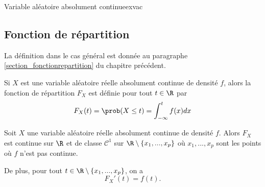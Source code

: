 \begin{exemple}{Variable aléatoire absolument continue}{exvac}
\begin{center}
    \end{center}

\end{exemple}


\subsection{Fonction de répartition}

La définition dans le cas général est donnée au paragraphe \ref{section_fonctionrepartition} du chapitre précédent. 

Si $X$ est une variable aléatoire réelle absolument continue de densité $f$, alors la fonction de répartition $F_X$ est définie pour tout $t \in \R $ par 
$$F_X(t) = \prob(X \leq t) = \int_{-\infty}^{t} f(x)dx$$

\begin{proposition}{}{}
	Soit $X$ une variable aléatoire réelle absolument continue de densité $f$. Alors $F_X$ est continue sur $\R$ et de classe $\mathcal{C}^1$ sur $\R \setminus \{x_1,...,x_p\}$ où $x_1,...,x_p$ sont les points où $f$ n'est pas continue. 

De plus, pour tout $t \in \R \setminus \{x_1,...,x_p\}$, on a
$$F_X'(t) = f(t).$$
\end{proposition}

